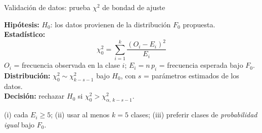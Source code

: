\documentclass[aspectratio=1610, 10pt]{beamer}
\begin{document}
\begin{frame}{Validación de datos: prueba $\chi^2$ de bondad de ajuste}
  \begin{definicionbox}
    \footnotesize
    \textbf{Hipótesis:} $H_0$: los datos provienen de la distribución $F_0$
    propuesta.\\
    \textbf{Estadístico:}
    \[
      \chi^2_0 = \sum_{i=1}^{k} \frac{(O_i - E_i)^2}{E_i}
    \]
    $O_i$ = frecuencia observada en la clase $i$;
    $E_i = n\,p_i$ = frecuencia esperada bajo $F_0$.\\
    \textbf{Distribución:} $\chi^2_0 \sim \chi^2_{k-s-1}$ bajo $H_0$, con
    $s$ = parámetros estimados de los datos.\\
    \textbf{Decisión:} rechazar $H_0$ si $\chi^2_0 > \chi^2_{\alpha,\,k-s-1}$.
  \end{definicionbox}

  \vspace{4pt}
  \begin{notabox}
    \footnotesize
    (i) cada $E_i \geq 5$;\quad
    (ii) usar al menos $k=5$ clases;\quad
    (iii) preferir clases de \emph{probabilidad igual} bajo $F_0$.
  \end{notabox}
\end{frame}
\end{document}
